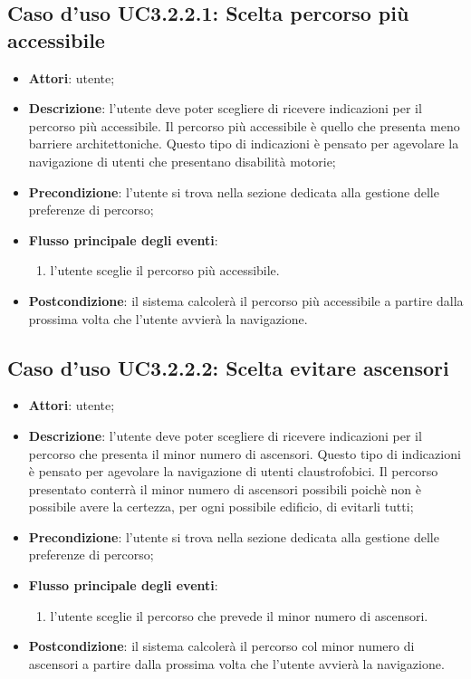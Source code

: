 \documentclass[../AnalisiDeiRequisiti.tex]{subfiles}
\begin{document}
\subsection{Caso d'uso UC3.2.2.1: Scelta percorso più accessibile}
\begin{itemize}
	\item \textbf{Attori}: utente;
	\item \textbf{Descrizione}: l'utente deve poter scegliere di ricevere indicazioni per il percorso più accessibile. Il percorso più accessibile è quello che presenta meno barriere architettoniche. Questo tipo di indicazioni è pensato per agevolare la navigazione di utenti che presentano disabilità motorie; 
	\item \textbf{Precondizione}: l'utente si trova nella sezione dedicata alla gestione delle preferenze di percorso;
	
	\item \textbf{Flusso principale degli eventi}:
	\begin{enumerate}
		\item l'utente sceglie il percorso più accessibile.
		
	\end{enumerate}
	\item \textbf{Postcondizione}: il sistema calcolerà il percorso più accessibile a partire dalla prossima volta che l'utente avvierà la navigazione.
\end{itemize}
\hypertarget{UC3.2.2.2}{}
\subsection{Caso d'uso UC3.2.2.2: Scelta evitare ascensori}
\begin{itemize}
	\item \textbf{Attori}: utente;
	\item \textbf{Descrizione}: l'utente deve poter scegliere di ricevere indicazioni per il percorso che presenta il minor numero di ascensori. Questo tipo di indicazioni è pensato per agevolare la navigazione di utenti claustrofobici. Il percorso presentato conterrà il minor numero di ascensori possibili poichè non è possibile avere la certezza, per ogni possibile edificio, di evitarli tutti; 
	\item \textbf{Precondizione}: l'utente si trova nella sezione dedicata alla gestione delle preferenze di percorso;
	
	\item \textbf{Flusso principale degli eventi}:
	\begin{enumerate}
		\item l'utente sceglie il percorso che prevede il minor numero di ascensori.
		
	\end{enumerate}
	\item \textbf{Postcondizione}: il sistema calcolerà il percorso col minor numero di ascensori a partire dalla prossima volta che l'utente avvierà la navigazione.
\end{itemize}
\hypertarget{UC3.2.2.3}{}
\end{document}
